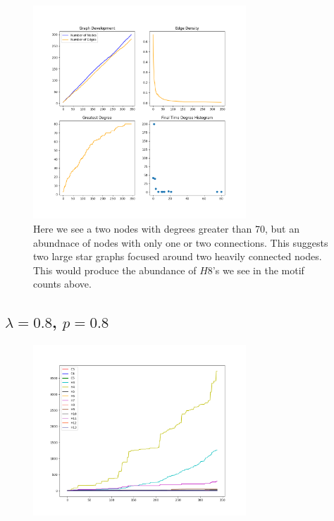 \begin{figure}[h!]
    \includegraphics[width=8cm]{Images/twitter_sim_stats_3_0.2_0.8.png}
    \centering
    \caption{Here we see a two nodes with degrees greater than 70,
    but an abundnace of nodes with only one or two connections. This suggests
    two large star graphs focused around two heavily connected nodes. This 
    would produce the abundance of $H8$'s we see in the motif counts above.}
\end{figure}

\FloatBarrier

\subsection*{$\lambda=0.8$, $p=0.8$}

\begin{figure}[h!]
    \includegraphics[width=8cm]{Images/twitter_sim_for_stats_3_0.8_0.8.png}
    \centering
\end{figure}

